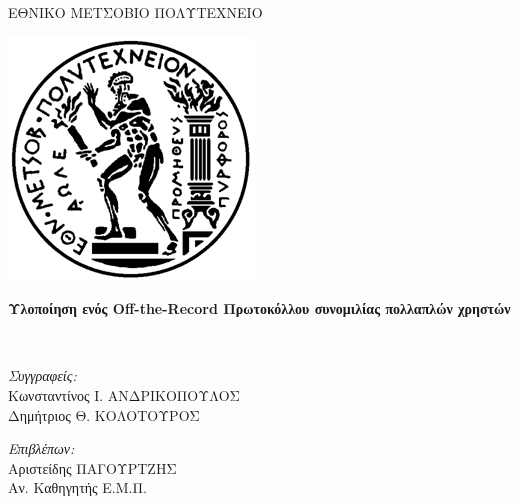 \documentclass[
11pt, %
english, %
singlespacing, %
parskip, %
headsepline, %
]{MastersDoctoralThesis} %
\author{\mbox{Konsantinos \textsc{Andrikopoulos}}, Dimitrios \textsc{Kolotouros}} %
\begin{document}
\frontmatter %

\pagestyle{plain} %

\begin{titlepage}
\begin{center}

{\scshape\LARGE ΕΘΝΙΚΟ ΜΕΤΣΟΒΙΟ ΠΟΛΥΤΕΧΝΕΙΟ\par} %
{\centering \includegraphics[scale=0.6]{Pyrforos.png}}
\vspace{1.5cm}
\HRule \\[0.4cm] %
{\huge \bfseries Υλοποίηση ενός Off-the-Record Πρωτοκόλλου συνομιλίας πολλαπλών χρηστών\par}\vspace{0.4cm} %
\HRule \\[1.5cm] %

\begin{minipage}[t]{0.49\textwidth}
\begin{flushleft} \large
\emph{Συγγραφείς:}\\
\small
Κωνσταντίνος Ι. ΑΝΔΡΙΚΟΠΟΥΛΟΣ \\
Δημήτριος Θ. ΚΟΛΟΤΟΥΡΟΣ\\%
\end{flushleft}
\end{minipage}
\begin{minipage}[t]{0.49\textwidth}
\begin{flushright} \large
\emph{Επιβλέπων:} \\
Αριστείδης ΠΑΓΟΥΡΤΖΗΣ\\
Αν. Καθηγητής Ε.Μ.Π.%
\end{flushright}
\end{minipage}\\[3cm]


\end{center}
\end{titlepage}
\end{document}
